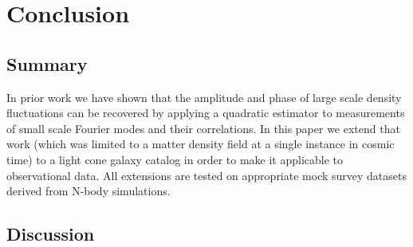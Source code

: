 \documentclass[prd,amsmath,amssymb,floatfix,superscriptaddress,nofootinbib,twocolumn]{revtex4-1}
\def\bea{\begin{eqnarray}}
\def\eea{\end{eqnarray}}
\newcommand{\rs}{\rm rs}
\newcommand{\vs}{\nonumber\\}
\newcommand{\vk}{\vec{k}}
\begin{document}


\section{Conclusion} \label{sec5}
\subsection{Summary}
In prior work \cite{Li:2020fir} we have shown that the amplitude and phase of large scale density fluctuations can be recovered by applying a quadratic estimator to measurements of small scale Fourier modes and their correlations. In this paper we extend that work (which was limited to a matter density field at a single instance in cosmic time) to a light cone galaxy catalog in order to make it applicable to observational data. All extensions are tested on appropriate mock survey datasets derived from N-body simulations.\

 
\subsection{Discussion}
\end{document}
